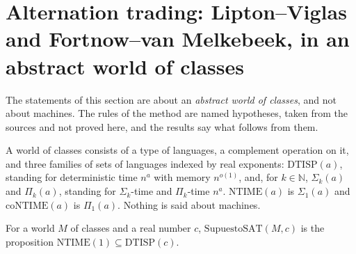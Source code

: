 \section{Alternation trading: Lipton--Viglas and Fortnow--van Melkebeek, in an abstract world of classes}
\label{sec:search-alternation}

The statements of this section are about an \emph{abstract world of classes}, and not about
machines. The rules of the method are named hypotheses, taken from the sources and not proved
here, and the results say what follows from them.

\begin{definition}
  \label{def:search-mundo}
  \leanok
  A world of classes consists of a type of languages, a complement operation on it, and three
  families of sets of languages indexed by real exponents: $\mathrm{DTISP}(a)$, standing for
  deterministic time $n^a$ with memory $n^{o(1)}$, and, for $k \in \mathbb{N}$, $\Sigma_k(a)$ and
  $\Pi_k(a)$, standing for $\Sigma_k$-time and $\Pi_k$-time $n^a$. $\mathrm{NTIME}(a)$ is
  $\Sigma_1(a)$ and $\mathrm{coNTIME}(a)$ is $\Pi_1(a)$. Nothing is said about machines.
\end{definition}

\begin{definition}
  \label{def:search-supuesto-sat}
  \leanok
  For a world $M$ of classes and a real number $c$, $\mathrm{SupuestoSAT}(M, c)$ is the proposition
  $\mathrm{NTIME}(1) \subseteq \mathrm{DTISP}(c)$.
\end{definition}

